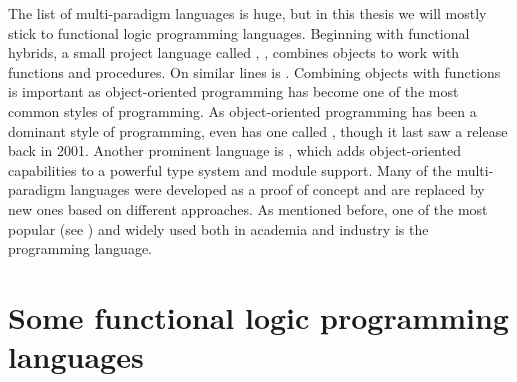 \documentclass[thesis-solanki.tex]{subfiles}
\begin{document}
The list of multi-paradigm languages is huge, but in this thesis we will mostly stick to functional logic
programming languages.
Beginning with functional hybrids, a small project language called , \cite{website:virgil},
combines objects to work with functions and procedures.
On similar lines is  \cite{website:closwiki}.
Combining objects with functions is important as object-oriented programming has become one of the most common
styles of programming.
As object-oriented programming has been a dominant style of programming, even  has one called
 \cite{website:ohaskell}, though it last saw a release back in 2001.
Another prominent language is  \cite{website:ocamlwiki,website:ocamllang}, which adds
object-oriented capabilities to a powerful type system and module support.
Many of the multi-paradigm languages were developed as a proof of concept and are replaced by new ones based on
different approaches.
As mentioned before, one of the most popular (see \cite{website:langpop}) and widely used both in academia and
industry is the  \cite{website:scala} programming language.


\section{Some functional logic programming languages}
\end{document}
